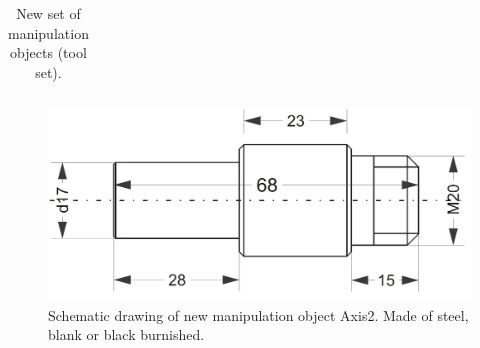 \begin{table}[h!]
\begin{tabular}{|m{2cm}|c|c|m{8cm}|}
\end{tabular}
\caption{\RCAW New set of manipulation objects (tool set).}
\label{tab:new_objects2}
\end{table}

			
\begin{figure}[h!]
	\begin{center}
		\includegraphics[width=\textwidth]{./images/newObjects/welleSchematic.JPG}
	\end{center}
	\caption{Schematic drawing of new manipulation object Axis2. Made of steel, blank or black burnished.}
	\label{fig:welle2Schematic}
\end{figure}